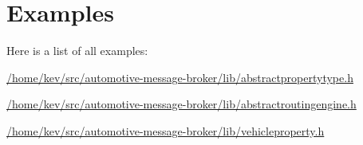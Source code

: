 \section{Examples}
Here is a list of all examples\+:\begin{DoxyCompactItemize}
\item 
\hyperlink{_2home_2kev_2src_2automotive-message-broker_2lib_2abstractpropertytype_8h-example}{/home/kev/src/automotive-\/message-\/broker/lib/abstractpropertytype.\+h}
\item 
\hyperlink{_2home_2kev_2src_2automotive-message-broker_2lib_2abstractroutingengine_8h-example}{/home/kev/src/automotive-\/message-\/broker/lib/abstractroutingengine.\+h}
\item 
\hyperlink{_2home_2kev_2src_2automotive-message-broker_2lib_2vehicleproperty_8h-example}{/home/kev/src/automotive-\/message-\/broker/lib/vehicleproperty.\+h}
\end{DoxyCompactItemize}
